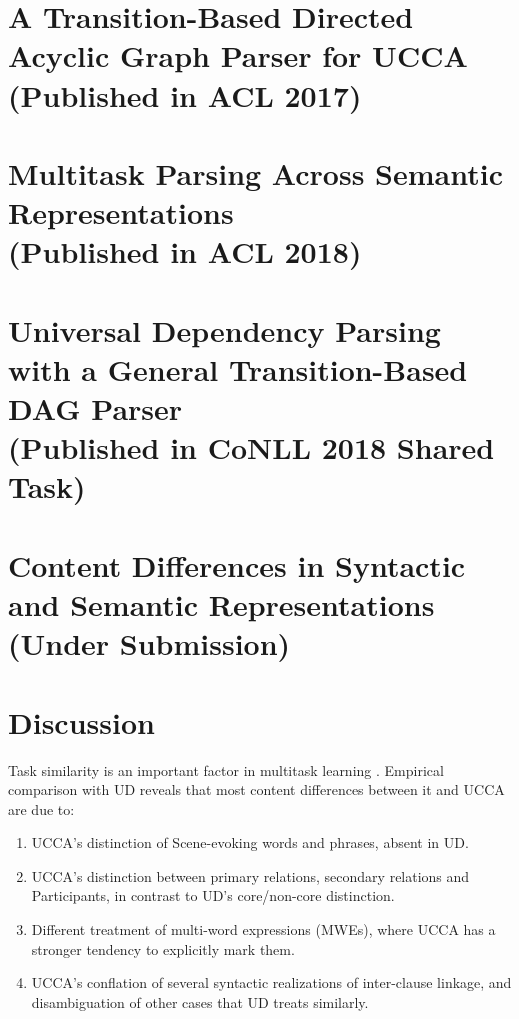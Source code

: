 \documentclass[12pt]{report}
\begin{document}
\chapter{A Transition-Based Directed Acyclic Graph Parser for UCCA \\ (Published in ACL 2017)}



\chapter{Multitask Parsing Across Semantic Representations \\ (Published in ACL 2018)}



\chapter{Universal Dependency Parsing with a General Transition-Based DAG Parser \\ (Published in CoNLL 2018 Shared Task)}



\chapter{Content Differences in Syntactic and Semantic Representations \\ (Under Submission)}



\chapter{Discussion}

Task similarity is an important factor in multitask learning
\citep{E17-2026,E17-1005}.
Empirical comparison with UD reveals that most content differences between it and UCCA are due to:
  \begin{enumerate}
      \item UCCA's distinction of Scene-evoking words and phrases, absent in UD.
      \item UCCA's distinction between primary relations, secondary relations
        and Participants, in contrast to UD's core/non-core distinction.
      \item Different treatment of multi-word expressions (MWEs),
        where UCCA has a stronger tendency to explicitly mark them.
      \item UCCA's conflation of several syntactic realizations of inter-clause linkage,
        and disambiguation of other cases that UD treats similarly.
   \end{enumerate}
\end{document}
